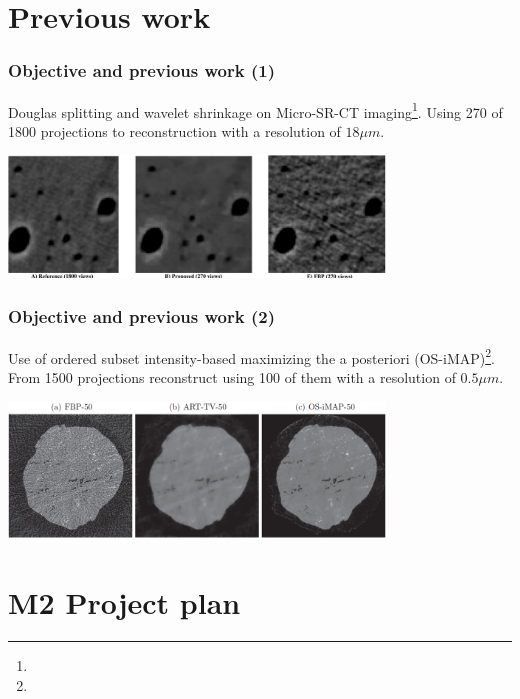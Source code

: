 \documentclass{beamer}
\newcommand\footcite[1]{\footnote{\bibentry{#1}}\label{\thepage:#1}}
\begin{document}
\section{Previous work}
	
\begin{frame}
\small
	\frametitle{Objective and previous work (1)}
		 Douglas splitting and wavelet shrinkage on Micro-SR-CT imaging\footcite{[2]}. Using 270 of 1800 projections to reconstruction with a resolution of $18 \mu m$. 
		 
	\begin{center}
			\includegraphics[width=10cm]{2.png}		
		\end{center}
\end{frame}

\begin{frame}
	\frametitle{Objective and previous work (2)}
	Use of ordered subset intensity-based maximizing the a posteriori (OS-iMAP)\footcite{[19]}. From 1500 projections reconstruct using 100 of them with a resolution of $0.5 \mu m$.
		\begin{center}
			\includegraphics[width=10cm]{19.png}		
		\end{center}
	
\end{frame}

\section{M2 Project plan}
\end{document}
